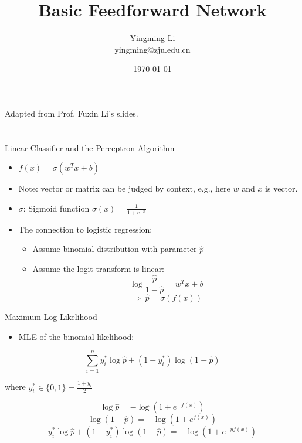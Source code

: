 \documentclass[12pt,notes,mathserif]{beamer}
\title{Basic Feedforward Network}
\author[YingmingLi]{Yingming Li \\ yingming@zju.edu.cn}
\institute[DSERC, ZJU]{Data Science \& Engineering Research Center, ZJU}
\date[\today]{\today}
\providecommand{\tightlist}{%
	\setlength{\itemsep}{0pt}\setlength{\parskip}{0pt}}
\begin{document}

\begin{frame}[c]
	\titlepage
	\begin{center}
		Adapted from Prof. Fuxin Li's slides. 
				
	\end{center}
\end{frame}

\section{}\label{section}

\begin{frame}{Linear Classifier and the Perceptron Algorithm}

\begin{itemize}
\item
  \(f(x)=\sigma(w^T{x}+b)\)
\item
  Note: vector or matrix can be judged by context, e.g., here \(w\) and
  \(x\) is vector.
\item
  \(\sigma\): Sigmoid function \(\sigma(x)=\frac{1}{1+e^{-x}}\)
\item
  The connection to logistic regression:

  \begin{itemize}
  \tightlist
  \item
    Assume binomial distribution with parameter \(\hat{p}\)
  \item
    Assume the logit transform is linear:
    \[\log\frac{\hat{p}}{1-\hat{p}}=w^{{T}}x+b\]
    \[\Rightarrow\ \hat{p}=\sigma(f(x))\]
  \end{itemize}
\end{itemize}

\end{frame}

\begin{frame}{Maximum Log-Likelihood}

\begin{itemize}
\tightlist
\item
  MLE of the binomial likelihood:
\end{itemize}

\[\sum_{i=1} ^{n} y_i^* \log \hat{p} + (1-{y}_{i}^{*})\log(1-\hat{p})\]

where \({y}_{i}^{*}\in \{0,1\} =\frac{1+y_{i}}{2}\)

\[\log\hat{p}=-\log(1+e^{-f(x)})\] \[\log(1-\hat{p})=-\log(1+e^{f(x)})\]
\[{y}_{{i}}^{*}\log\hat{p}+(1-{y}_{i}^{*})\log(1-\hat{p})=-\log(1+e^{-yf(x)})\]

\end{frame}
\end{document}
